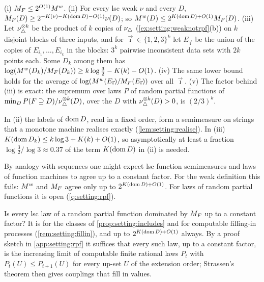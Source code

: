 \begin{theorem}\label{thm:setting:weakvsmachine}
(i) $M_{F}\le2^{O(1)}M^{w}$. (ii) For every lsc weak $\nu$ and every $D$, $M_{F}(D)\ge2^{-K(\nu)-K(\operatorname{dom} D)-O(1)}\nu(D)$; so $M^{w}(D)\le2^{K(\operatorname{dom} D)+O(1)}M_{F}(D)$. (iii) Let $\nu_{\triangle}^{\otimes k}$ be the product of $k$ copies of $\nu_{\triangle}$ (\cref{ex:setting:weaknotrpf}(b)) on $k$ disjoint blocks of three inputs, and for $\vec\imath\in\{1,2,3\}^k$ let $E_{\vec\imath}$ be the union of the copies of $E_{i_1},\dots,E_{i_k}$ in the blocks: $3^k$ pairwise inconsistent data sets with $2k$ points each. Some $D_k$ among them has $\log(M^{w}(D_k)/M_{F}(D_k))\ge k\log\frac32-K(k)-O(1)$. (iv) The same lower bound holds for the average of $\log(M^{w}(E_{\vec\imath})/M_{F}(E_{\vec\imath}))$ over all $\vec\imath$. (v) The factor behind (iii) is exact: the supremum over laws $P$ of random partial functions of $\min_DP(F\supseteq D)/\nu_{\triangle}^{\otimes k}(D)$, over the $D$ with $\nu_{\triangle}^{\otimes k}(D)>0$, is $(2/3)^k$.
\end{theorem}

In (ii) the labels of $\operatorname{dom} D$, read in a fixed order, form a semimeasure on strings that a monotone machine realises exactly (\cref{lem:setting:realise}). In (iii) $K(\operatorname{dom} D_k)\le k\log3+K(k)+O(1)$, so asymptotically at least a fraction $\log\frac32/\log3\approx0.37$ of the term $K(\operatorname{dom} D)$ in (ii) is needed.

\begin{remark}\label{rem:setting:h1a}
By analogy with sequences \citep{zvonkin1970complexity} one might expect lsc function semimeasures and laws of function machines to agree up to a constant factor. For the weak definition this fails: $M^{w}$ and $M_{F}$ agree only up to $2^{K(\operatorname{dom} D)+O(1)}$. For laws of random partial functions it is open (\cref{q:setting:rpf}).
\end{remark}

\begin{question}\label{q:setting:rpf}
Is every lsc law of a random partial function dominated by $M_{F}$ up to a constant factor? It is for the classes of \cref{prop:setting:includes} and for computable filling-in processes (\cref{rem:setting:fillin}), and up to $2^{K(\operatorname{dom} D)+O(1)}$ always. By a proof sketch in \cref{app:setting:rpf} it suffices that every such law, up to a constant factor, is the increasing limit of computable finite rational laws $P_t$ with $P_t(U)\le P_{t+1}(U)$ for every up-set $U$ of the extension order; Strassen's theorem \citep{strassen1965existence} then gives couplings that fill in values.
\end{question}

